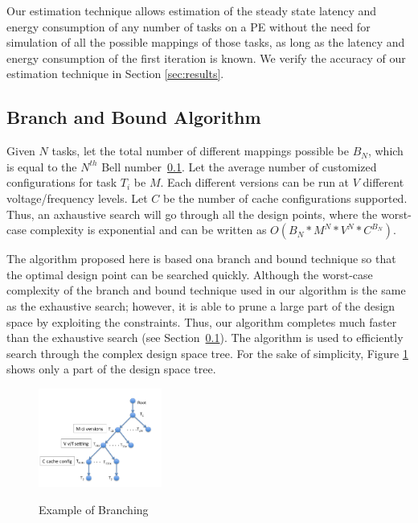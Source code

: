 Our estimation technique allows estimation of the steady state latency
and energy consumption of any number of tasks on a PE without the
need for simulation of all the possible mappings of those tasks, as
long as the latency and energy consumption of the first iteration is
known. We verify the accuracy of our estimation technique in Section
\ref{sec:results}.

\subsection{Branch and Bound Algorithm}
Given $N$ tasks, let the total number of different mappings possible be
$B_N$, which is equal to the $N^{th}$ Bell number~\ref{}. Let the average
number of customized configurations for task $T_i$ be $M$. Each different
versions can be run at $V$ different voltage/frequency levels. Let $C$ be
the number of cache configurations supported. Thus, an axhaustive search
will go through all the design points, where the worst-case complexity is
exponential and can be written as \begin{math}O(B_N * M^N * V^N * C^{B_N}
)\end{math}.

The algorithm proposed here is based ona branch and bound technique
so that the optimal design point can be searched quickly. Although the
worst-case complexity of the branch and bound technique used in our
algorithm is the same as the exhaustive search; however, it is able to
prune a large part of the design space by exploiting the constraints.
Thus, our algorithm completes much faster than the exhaustive search (see
Section~\ref{}). The algorithm is used to efficiently search through
the complex design space tree. For the sake of simplicity, Figure
\ref{fig:bnb} shows only a part of the design space tree.

\begin{figure}[h]
\center
\includegraphics[width=0.36\textwidth]{branch.png}
\label{fig:bnb}
\caption {Example of Branching}
\end{figure}

